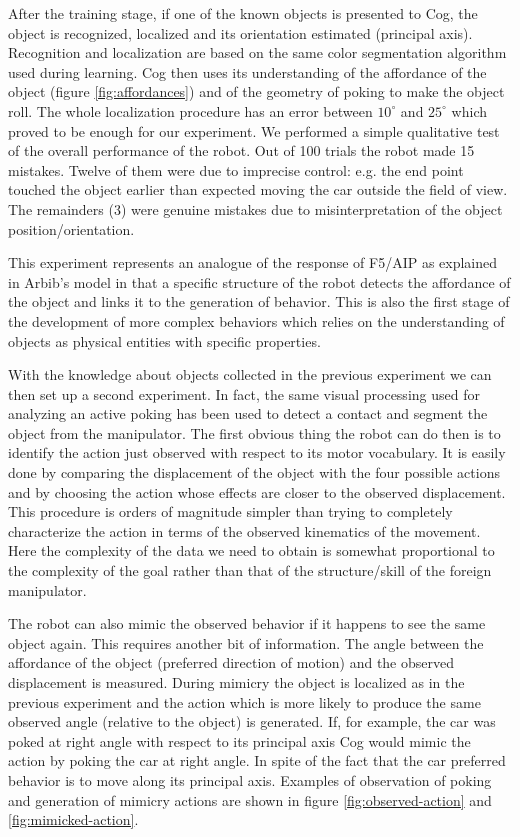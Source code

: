 After the training stage, if one of the known objects is presented to Cog, the 
object is recognized, localized and its orientation estimated (principal 
axis). Recognition and localization are based on the same color 
segmentation algorithm used during learning. Cog then uses its 
understanding of the affordance of the object (figure \ref{fig:affordances}) 
and of the geometry of poking to make the object roll. The whole localization 
procedure has an error between $10^{\circ}$ and $25^{\circ}$ which proved 
to be enough for our experiment. We performed a simple qualitative test of 
the overall performance of the robot. Out of 100 trials the robot made 15 
mistakes. Twelve of them were due to imprecise control: e.g. the end point 
touched the object earlier than expected moving the car outside the field of 
view. The remainders (3) were genuine mistakes due to misinterpretation of 
the object position/orientation.

This experiment represents an analogue of the response of F5/AIP as 
explained in Arbib's model \cite{fagg-arbib-1998} in that a specific 
structure of the robot detects the affordance of the object and links 
it to the generation of behavior. This is also the first stage of 
the development of more complex behaviors which relies on the understanding 
of objects as physical entities with specific properties.

With the knowledge about objects collected in the previous experiment
we can then set up a second experiment. In fact, the same visual processing 
used for analyzing an active poking has been used to detect a contact and 
segment the object from the manipulator. 
The first obvious thing the robot can do then is to identify the action 
just observed with respect to its motor vocabulary. It is easily done by 
comparing the displacement of the object with the four possible actions and 
by choosing the action whose effects are closer to the observed displacement. 
This procedure is orders of magnitude simpler than trying to completely 
characterize the action in terms of the observed kinematics of the movement. 
Here the complexity of the data we need to obtain is somewhat proportional 
to the complexity of the goal rather than that of the structure/skill of 
the foreign manipulator.

The robot can also mimic the observed behavior if it happens to see the 
same object again. This requires another bit of information. The angle 
between the affordance of the object (preferred direction of motion) and the 
observed displacement is measured. During mimicry the object is localized as 
in the previous experiment and the action which is more likely to 
produce the same observed angle (relative to the object) is generated. 
If, for example, the car was poked at right angle with respect to its principal 
axis Cog would mimic the action by poking the car at right angle. In spite 
of the fact that the car preferred behavior is to move along its principal 
axis. Examples of observation of poking and generation of mimicry actions are 
shown in figure \ref{fig:observed-action} and \ref{fig:mimicked-action}.

